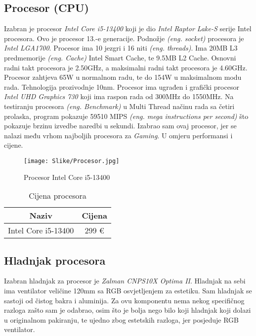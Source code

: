 \documentclass[14pt]{article}
\begin{document}
    \subsection{Procesor (CPU)}
    Izabran je procesor \textit{Intel Core i5-13400} koji je dio \textit{Intel Raptor Lake-S} serije Intel procesora. Ovo je procesor 13.-e generacije. Podnožje \emph{(eng. socket)} procesora je \textit{Intel LGA1700}. Procesor ima 10 jezgri i 16 niti \emph{(eng. threads)}. Ima 20MB L3 predmemorije \emph{(eng. Cache)} Intel Smart Cache, te 9.5MB L2 Cache. Osnovni radni takt procesora je 2.50GHz, a maksimalni radni takt procesora je 4.60GHz. Procesor zahtjeva 65W u normalnom radu, te do 154W u maksimalnom modu rada. Tehnologija prozivodnje 10nm. Procesor ima ugrađen i grafički procesor \textit{Intel UHD Graphics 730} koji ima raspon rada od 300MHz do 1550MHz. Na testiranju procesora \emph{(eng. Benchmark)} u Multi Thread načinu rada sa četiri prolaska, program pokazuje 59510 MIPS \emph{(eng. mega instructions per second)} što pokazuje brzinu izvedbe naredbi u sekundi. Izabrao sam ovaj procesor, jer se nalazi među vrhom najboljih procesora za \textit{Gaming}. U omjeru performansi i cijene.

    \begin{figure}[H]
        \centering
        \texttt{[image: Slike/Procesor.jpg]}
        \caption{Procesor Intel Core i5-13400}
        \label{fig:Procesor}
    \end{figure}

    \begin{table}[H]
        \centering
        \begin{tabular}{|c|c|}
            \hline
            Naziv & Cijena \\
            \hline
            Intel Core i5-13400 & 299 € \\
            \hline
        \end{tabular}
        \caption{Cijena procesora}
        \label{tab:Procesor}
    \end{table}
    
    \clearpage
    \subsection{Hladnjak procesora}
    Izabran hladnjak za procesor je \textit{Zalman CNPS10X Optima II}. Hladnjak na sebi ima ventilator veličine 120mm sa RGB osvjetljenjem za estetiku. Sam hladnjak se sastoji od čistog bakra i aluminija. Za ovu komponentu nema nekog specifičnog razloga zašto sam je odabrao, osim što je bolja nego bilo koji hladnjak koji dolazi u originalnom pakiranju, te ujedno zbog estetskih razloga, jer posjeduje RGB ventilator.
\end{document}
